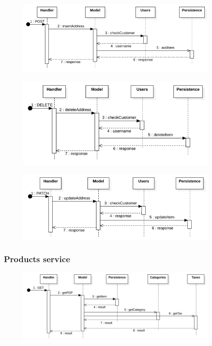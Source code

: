 \begin{figure}[H]
    \includegraphics[width=0.9\textwidth]{res/images/sequence-diagrams/addresses/insertAddress.png}
\end{figure}

\begin{figure}[H]
    \includegraphics[width=0.9\textwidth]{res/images/sequence-diagrams/addresses/removeAddress.png}
\end{figure}

\begin{figure}[H]
    \includegraphics[width=0.9\textwidth]{res/images/sequence-diagrams/addresses/updateAddress.png}
\end{figure}


\subsubsection{Products service}
\begin{figure}[H]
    \includegraphics[width=0.9\textwidth]{res/images/sequence-diagrams/products/getPDP.png}
\end{figure}


